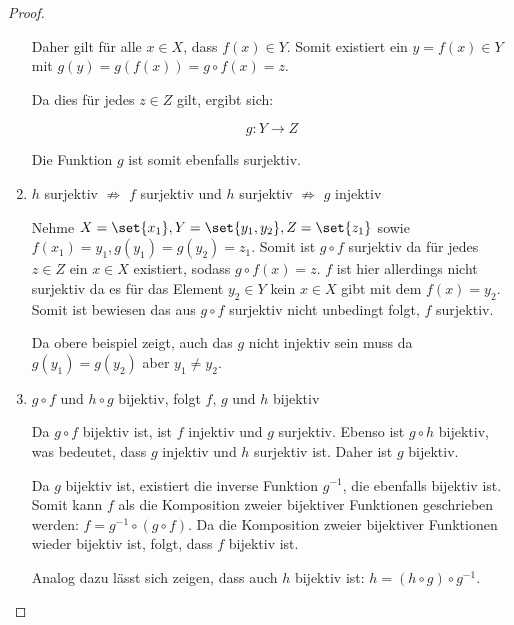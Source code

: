 \documentclass{../problemset}
\begin{document}
\begin{problem}
\begin{proof}
\begin{enumerate}
		      Daher gilt für alle \(x \in X\), dass \(f(x) \in Y\). Somit existiert ein \(y = f(x) \in Y\) mit \(g(y) = g(f(x)) = g \circ f(x) = z\).

		      Da dies für jedes \(z \in Z\) gilt, ergibt sich:

		      \[ g: Y \to Z \]

		      Die Funktion \(g\) ist somit ebenfalls surjektiv.

		\item $h$ surjektiv $\not\Rightarrow$ $f$ surjektiv und $h$ surjektiv $\not\Rightarrow$ $g$ injektiv

		      Nehme $X = \set{x_1}, Y = \set{y_1, y_2}, Z=\set{z_1}$ sowie $f(x_1) = y_1, g(y_1) = g(y_2) = z_1$.
		      Somit ist $g \circ f$ surjektiv da für jedes $z \in Z$ ein $x \in X$ existiert, sodass $g \circ f(x) = z$.
		      $f$ ist hier allerdings nicht surjektiv da es für das Element $y_2 \in Y$ kein $x \in X$ gibt mit dem $f(x) = y_2$.
		      Somit ist bewiesen das aus $g \circ f$ surjektiv nicht unbedingt folgt, $f$ surjektiv. \checkmark

		      Da obere beispiel zeigt, auch das $g$ nicht injektiv sein muss da $g(y_1) = g(y_2)$ aber $y_1 \neq y_2$. \checkmark

		\item $g \circ f$ und $h \circ g$ bijektiv, folgt $f$, $g$ und $h$ bijektiv

		      Da $g \circ f$ bijektiv ist, ist $f$ injektiv und $g$ surjektiv.
		      Ebenso ist $g \circ h$ bijektiv, was bedeutet, dass $g$ injektiv und $h$ surjektiv ist.
		      Daher ist $g$ bijektiv.

		      Da $g$ bijektiv ist, existiert die inverse Funktion $g^{-1}$, die ebenfalls bijektiv ist.
		      Somit kann $f$ als die Komposition zweier bijektiver Funktionen geschrieben werden: $f = g^{-1} \circ (g \circ f)$.
		      Da die Komposition zweier bijektiver Funktionen wieder bijektiv ist, folgt, dass $f$ bijektiv ist.

		      Analog dazu lässt sich zeigen, dass auch $h$ bijektiv ist: $h = (h \circ g) \circ g^{-1}$.

	\end{enumerate}
\end{proof}
\end{problem}

\pagebreak
\end{document}
